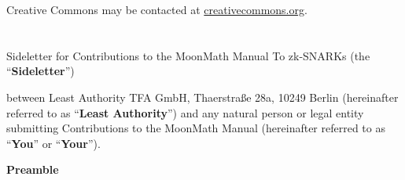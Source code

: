 Creative Commons may be contacted at \href{creativecommons.org}{creativecommons.org}.

\chapter*{ }
\label{chapter:contrib}

\begin{center}\Large 
Sideletter for Contributions to the MoonMath Manual To zk-SNARKs (the ``\textbf{Sideletter}'')
\end{center}

between Least Authority TFA GmbH, Thaerstraße 28a, 10249 Berlin (hereinafter referred to as ``\textbf{Least Authority}'') and any natural person or legal entity submitting Contributions to the MoonMath Manual (hereinafter referred to as ``\textbf{You}'' or ``\textbf{Your}''). 
\begin{center}\bfseries
Preamble
\end{center}
